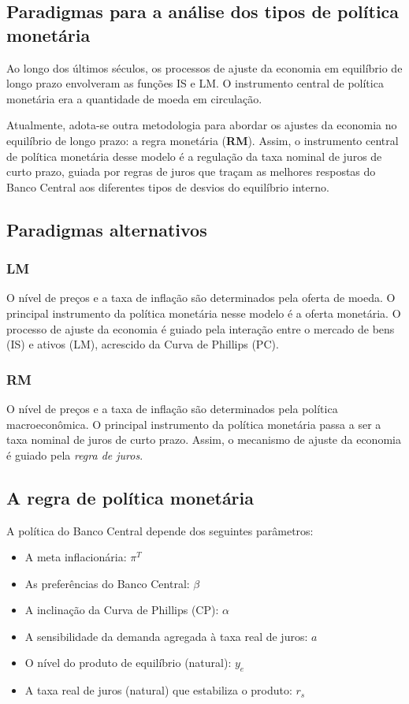 \documentclass[a4paper,12pt]{article}[abntex2]
\begin{document}
\subsection{\textbf{Paradigmas para a análise dos tipos de política monetária}}

Ao longo dos últimos séculos, os processos de ajuste da economia em equilíbrio de longo prazo envolveram as funções IS e LM. O instrumento central de política monetária era a quantidade de moeda em circulação.

Atualmente, adota-se outra metodologia para abordar os ajustes da economia no equilíbrio de longo prazo: a regra monetária (\textbf{RM}). Assim, o instrumento central de política monetária desse modelo é a regulação da taxa nominal de juros de curto prazo, guiada por regras de juros que traçam as melhores respostas do Banco Central aos diferentes tipos de desvios do equilíbrio interno.

\subsection{\textbf{Paradigmas alternativos}}

\subsubsection{\textbf{LM}}
O nível de preços e a taxa de inflação são determinados pela oferta de moeda. O principal instrumento da política monetária nesse modelo é a oferta monetária. O processo de ajuste da economia é guiado pela interação entre o mercado de bens (IS) e ativos (LM), acrescido da Curva de Phillips (PC).

\subsubsection{\textbf{RM}}
O nível de preços e a taxa de inflação são determinados pela política macroeconômica. O principal instrumento da política monetária passa a ser a taxa nominal de juros de curto prazo. Assim, o mecanismo de ajuste da economia é guiado pela \emph{regra de juros}.

\subsection{\textbf{A regra de política monetária}}

A política do Banco Central depende dos seguintes parâmetros:
\begin{itemize}
    \item A meta inflacionária: \(\pi^T\)
    \item As preferências do Banco Central: \(\beta\)
    \item A inclinação da Curva de Phillips (CP): \(\alpha\)
    \item A sensibilidade da demanda agregada à taxa real de juros: \(a\)
    \item O nível do produto de equilíbrio (natural): \(y_e\)
    \item A taxa real de juros (natural) que estabiliza o produto: \(r_s\)
\end{itemize}
\end{document}
